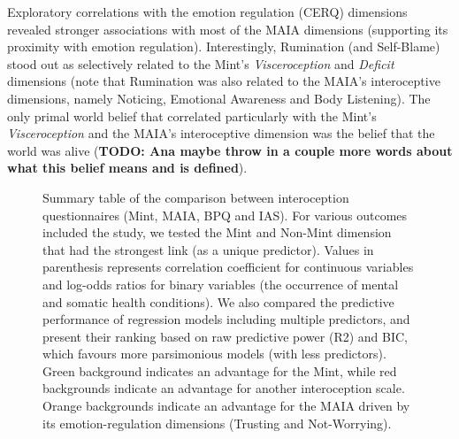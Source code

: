 \documentclass[
  jou,
  floatsintext,
  longtable,
  nolmodern,
  notxfonts,
  notimes,
  colorlinks=true,linkcolor=blue,citecolor=blue,urlcolor=blue]{apa7}
\begin{document}
Exploratory correlations with the emotion regulation (CERQ) dimensions
revealed stronger associations with most of the MAIA dimensions
(supporting its proximity with emotion regulation). Interestingly,
Rumination (and Self-Blame) stood out as selectively related to the
Mint's \emph{Visceroception} and \emph{Deficit} dimensions (note that
Rumination was also related to the MAIA's interoceptive dimensions,
namely Noticing, Emotional Awareness and Body Listening). The only
primal world belief that correlated particularly with the Mint's
\emph{Visceroception} and the MAIA's interoceptive dimension was the
belief that the world was alive (\textbf{TODO: Ana maybe throw in a
couple more words about what this belief means and is defined}).

\begin{figure}[!htbp]

{\caption{{Summary table of the comparison between interoception
questionnaires (Mint, MAIA, BPQ and IAS). For various outcomes included
the study, we tested the Mint and Non-Mint dimension that had the
strongest link (as a unique predictor). Values in parenthesis represents
correlation coefficient for continuous variables and log-odds ratios for
binary variables (the occurrence of mental and somatic health
conditions). We also compared the predictive performance of regression
models including multiple predictors, and present their ranking based on
raw predictive power (R2) and BIC, which favours more parsimonious
models (with less predictors). Green background indicates an advantage
for the Mint, while red backgrounds indicate an advantage for another
interoception scale. Orange backgrounds indicate an advantage for the
MAIA driven by its emotion-regulation dimensions (Trusting and
Not-Worrying).}{\label{fig-five}}}}


\end{figure}
\end{document}
